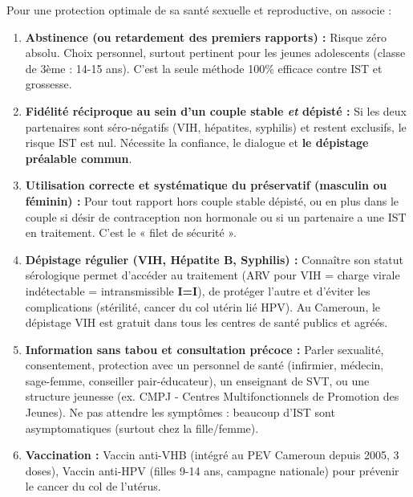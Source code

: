 \documentclass[11pt]{article}
\begin{document}
\begin{aretenir}
Pour une protection optimale de sa santé sexuelle et reproductive, on associe :
\begin{enumerate}
    \item \textbf{Abstinence (ou retardement des premiers rapports) :} Risque zéro absolu. Choix personnel, surtout pertinent pour les jeunes adolescents (classe de 3ème : 14-15 ans). C'est la seule méthode 100\% efficace contre IST et grossesse.
    \item \textbf{Fidélité réciproque au sein d'un couple stable \emph{et} dépisté :} Si les deux partenaires sont séro-négatifs (VIH, hépatites, syphilis) et restent exclusifs, le risque IST est nul. Nécessite la confiance, le dialogue et \textbf{le dépistage préalable commun}.
    \item \textbf{Utilisation correcte et systématique du préservatif (masculin ou féminin) :} Pour tout rapport hors couple stable dépisté, ou en plus dans le couple si désir de contraception non hormonale ou si un partenaire a une IST en traitement. C'est le « filet de sécurité ».
    \item \textbf{Dépistage régulier (VIH, Hépatite B, Syphilis) :} Connaître son statut sérologique permet d'accéder au traitement (ARV pour VIH = charge virale indétectable = intransmissible \textbf{I=I}), de protéger l'autre et d'éviter les complications (stérilité, cancer du col utérin lié HPV). Au Cameroun, le dépistage VIH est gratuit dans tous les centres de santé publics et agréés.
    \item \textbf{Information sans tabou et consultation précoce :} Parler sexualité, consentement, protection avec un personnel de santé (infirmier, médecin, sage-femme, conseiller pair-éducateur), un enseignant de SVT, ou une structure jeunesse (ex. CMPJ - Centres Multifonctionnels de Promotion des Jeunes). Ne pas attendre les symptômes : beaucoup d'IST sont asymptomatiques (surtout chez la fille/femme).
    \item \textbf{Vaccination :} Vaccin anti-VHB (intégré au PEV Cameroun depuis 2005, 3 doses), Vaccin anti-HPV (filles 9-14 ans, campagne nationale) pour prévenir le cancer du col de l'utérus.
\end{enumerate}
\end{aretenir}
\end{document}

